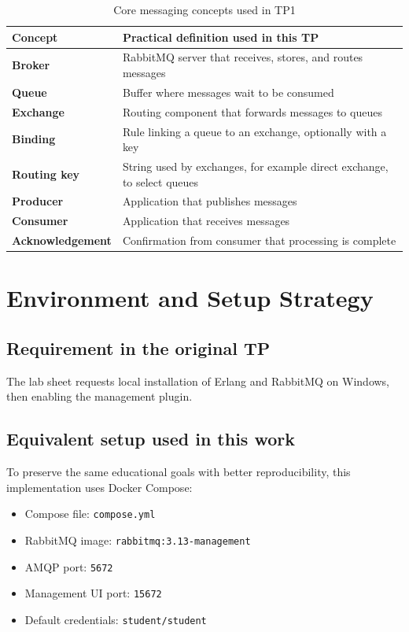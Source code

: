 \documentclass[a4paper,12pt]{article}
\begin{document}
\begin{table}[H]
\centering
\begin{tabularx}{\textwidth}{>{\bfseries}l X}
\toprule
Concept & Practical definition used in this TP \\
\midrule
Broker & RabbitMQ server that receives, stores, and routes messages \\
Queue & Buffer where messages wait to be consumed \\
Exchange & Routing component that forwards messages to queues \\
Binding & Rule linking a queue to an exchange, optionally with a key \\
Routing key & String used by exchanges, for example direct exchange, to select queues \\
Producer & Application that publishes messages \\
Consumer & Application that receives messages \\
Acknowledgement & Confirmation from consumer that processing is complete \\
\bottomrule
\end{tabularx}
\caption{Core messaging concepts used in TP1}
\end{table}

\section{Environment and Setup Strategy}

\subsection{Requirement in the original TP}

The lab sheet requests local installation of Erlang and RabbitMQ on Windows, then enabling the management plugin.

\subsection{Equivalent setup used in this work}

To preserve the same educational goals with better reproducibility, this implementation uses Docker Compose:

\begin{itemize}
    \item Compose file: \texttt{compose.yml}
    \item RabbitMQ image: \texttt{rabbitmq:3.13-management}
    \item AMQP port: \texttt{5672}
    \item Management UI port: \texttt{15672}
    \item Default credentials: \texttt{student/student}
\end{itemize}
\end{document}
